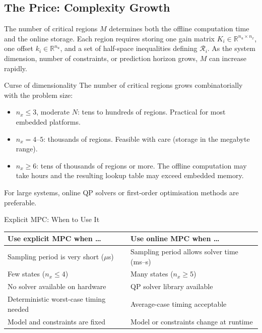 \subsection{The Price: Complexity Growth}

The number of critical regions $M$ determines both the offline computation time and the online storage. Each region requires storing one gain matrix $K_i \in \mathbb{R}^{n_u \times n_x}$, one offset $k_i \in \mathbb{R}^{n_u}$, and a set of half-space inequalities defining $\mathcal{R}_i$. As the system dimension, number of constraints, or prediction horizon grows, $M$ can increase rapidly.

\begin{alertbox}{Curse of dimensionality}
	The number of critical regions grows combinatorially with the problem size:
	\begin{itemize}[nosep]
		\item $n_x \le 3$, moderate $N$: tens to hundreds of regions. Practical for most embedded platforms.
		\item $n_x = 4$--$5$: thousands of regions. Feasible with care (storage in the megabyte range).
		\item $n_x \ge 6$: tens of thousands of regions or more. The offline computation may take hours and the resulting lookup table may exceed embedded memory.
	\end{itemize}
	For large systems, online QP solvers or first-order optimisation methods are preferable.
\end{alertbox}

\begin{summarybox}{Explicit MPC: When to Use It}
	\begin{center}
		\renewcommand{\arraystretch}{1.3}
		\begin{tabular}{p{} p{}}
			\toprule
			\textbf{Use explicit MPC when \dots} & \textbf{Use online MPC when \dots} \\
			\midrule
			Sampling period is very short ($\mu$s) & Sampling period allows solver time (ms--s) \\
			Few states ($n_x \le 4$) & Many states ($n_x \ge 5$) \\
			No solver available on hardware & QP solver library available \\
			Deterministic worst-case timing needed & Average-case timing acceptable \\
			Model and constraints are fixed & Model or constraints change at runtime \\
			\bottomrule
		\end{tabular}
	\end{center}
\end{summarybox}

